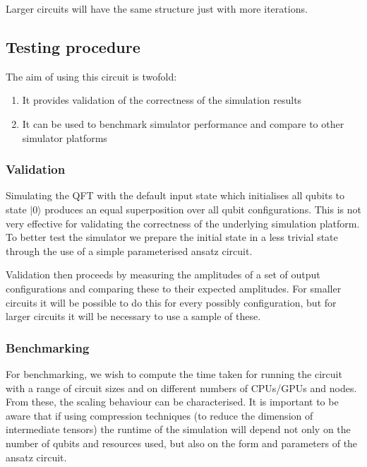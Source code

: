 Larger circuits will have the same structure just with more iterations.
 
\subsection{Testing procedure}
The aim of using this circuit is twofold:

\begin{enumerate}
\item It provides validation of the correctness of the simulation results
\item It can be used to benchmark simulator performance and compare to other simulator platforms
\end{enumerate}

\subsubsection{Validation}
Simulating the QFT with the default input state which initialises all qubits to state $|0\rangle$ produces an equal superposition over 
all qubit configurations. This is not very effective for validating the correctness of the underlying simulation platform. To better test
the simulator we prepare the initial state in a less trivial state through the use of a simple parameterised ansatz circuit. 


Validation then proceeds by measuring the amplitudes of a set of output configurations and comparing these to their expected amplitudes. For smaller circuits 
it will be possible to do this for every possibly configuration, but for larger circuits it will be necessary to use a sample of these.

\subsubsection{Benchmarking}
For benchmarking, we wish to compute the time taken for running the circuit with a range of circuit sizes and on different numbers of CPUs/GPUs and nodes. From 
these, the scaling behaviour can be characterised. It is important to be aware that if using compression techniques (to reduce the dimension of intermediate tensors) 
the runtime of the simulation will depend not only on the number of qubits and resources used, but also on the form and parameters of the ansatz circuit.

